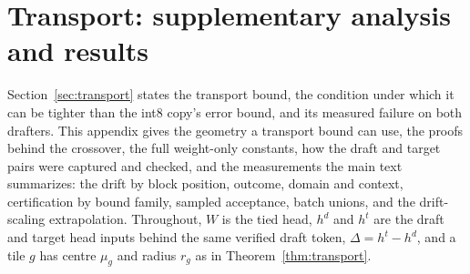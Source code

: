 \section{Transport: supplementary analysis and results}\label{app:transport}
Section~\ref{sec:transport} states the transport bound, the condition under which it can be tighter than the int8 copy's error bound, and its measured failure on both drafters. This appendix gives the geometry a transport bound can use, the proofs behind the crossover, the full weight-only constants, how the draft and target pairs were captured and checked, and the measurements the main text summarizes: the drift by block position, outcome, domain and context, certification by bound family, sampled acceptance, batch unions, and the drift-scaling extrapolation. Throughout, $W$ is the tied head, $h^d$ and $h^t$ are the draft and target head inputs behind the same verified draft token, $\Delta=h^t-h^d$, and a tile $g$ has centre $\mu_g$ and radius $r_g$ as in Theorem~\ref{thm:transport}.

